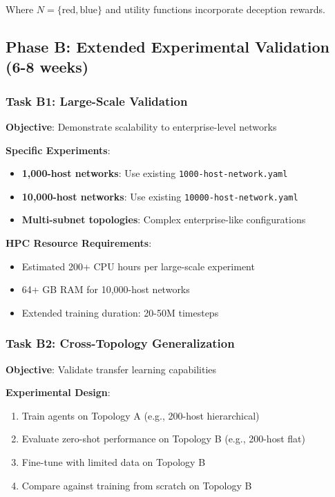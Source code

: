 \documentclass[11pt]{article}
\begin{document}
Where $N = \{\text{red}, \text{blue}\}$ and utility functions incorporate deception rewards.

\subsection{Phase B: Extended Experimental Validation (6-8 weeks)}

\subsubsection{Task B1: Large-Scale Validation}
\textbf{Objective}: Demonstrate scalability to enterprise-level networks

\textbf{Specific Experiments}:
\begin{itemize}
\item \textbf{1,000-host networks}: Use existing \texttt{1000-host-network.yaml}
\item \textbf{10,000-host networks}: Use existing \texttt{10000-host-network.yaml}  
\item \textbf{Multi-subnet topologies}: Complex enterprise-like configurations
\end{itemize}

\textbf{HPC Resource Requirements}:
\begin{itemize}
\item Estimated 200+ CPU hours per large-scale experiment
\item 64+ GB RAM for 10,000-host networks
\item Extended training duration: 20-50M timesteps
\end{itemize}

\subsubsection{Task B2: Cross-Topology Generalization}
\textbf{Objective}: Validate transfer learning capabilities

\textbf{Experimental Design}:
\begin{enumerate}
\item Train agents on Topology A (e.g., 200-host hierarchical)
\item Evaluate zero-shot performance on Topology B (e.g., 200-host flat)
\item Fine-tune with limited data on Topology B
\item Compare against training from scratch on Topology B
\end{enumerate}
\end{document}
